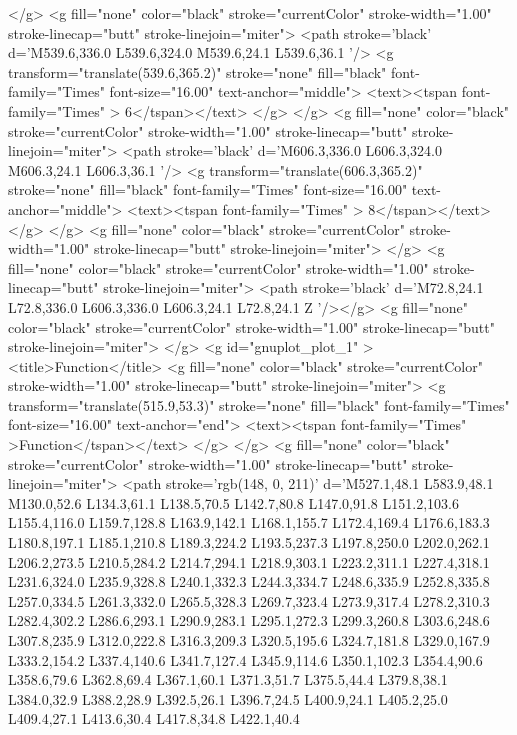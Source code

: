 </g>
<g fill="none" color="black" stroke="currentColor" stroke-width="1.00" stroke-linecap="butt" stroke-linejoin="miter">
	<path stroke='black'  d='M539.6,336.0 L539.6,324.0 M539.6,24.1 L539.6,36.1  '/>	<g transform="translate(539.6,365.2)" stroke="none" fill="black" font-family="Times" font-size="16.00"  text-anchor="middle">
		<text><tspan font-family="Times" > 6</tspan></text>
	</g>
</g>
<g fill="none" color="black" stroke="currentColor" stroke-width="1.00" stroke-linecap="butt" stroke-linejoin="miter">
	<path stroke='black'  d='M606.3,336.0 L606.3,324.0 M606.3,24.1 L606.3,36.1  '/>	<g transform="translate(606.3,365.2)" stroke="none" fill="black" font-family="Times" font-size="16.00"  text-anchor="middle">
		<text><tspan font-family="Times" > 8</tspan></text>
	</g>
</g>
<g fill="none" color="black" stroke="currentColor" stroke-width="1.00" stroke-linecap="butt" stroke-linejoin="miter">
</g>
<g fill="none" color="black" stroke="currentColor" stroke-width="1.00" stroke-linecap="butt" stroke-linejoin="miter">
	<path stroke='black'  d='M72.8,24.1 L72.8,336.0 L606.3,336.0 L606.3,24.1 L72.8,24.1 Z  '/></g>
<g fill="none" color="black" stroke="currentColor" stroke-width="1.00" stroke-linecap="butt" stroke-linejoin="miter">
</g>
	<g id="gnuplot_plot_1" ><title>Function</title>
<g fill="none" color="black" stroke="currentColor" stroke-width="1.00" stroke-linecap="butt" stroke-linejoin="miter">
	<g transform="translate(515.9,53.3)" stroke="none" fill="black" font-family="Times" font-size="16.00"  text-anchor="end">
		<text><tspan font-family="Times" >Function</tspan></text>
	</g>
</g>
<g fill="none" color="black" stroke="currentColor" stroke-width="1.00" stroke-linecap="butt" stroke-linejoin="miter">
	<path stroke='rgb(148,   0, 211)'  d='M527.1,48.1 L583.9,48.1 M130.0,52.6 L134.3,61.1 L138.5,70.5 L142.7,80.8 L147.0,91.8 L151.2,103.6
		L155.4,116.0 L159.7,128.8 L163.9,142.1 L168.1,155.7 L172.4,169.4 L176.6,183.3 L180.8,197.1 L185.1,210.8
		L189.3,224.2 L193.5,237.3 L197.8,250.0 L202.0,262.1 L206.2,273.5 L210.5,284.2 L214.7,294.1 L218.9,303.1
		L223.2,311.1 L227.4,318.1 L231.6,324.0 L235.9,328.8 L240.1,332.3 L244.3,334.7 L248.6,335.9 L252.8,335.8
		L257.0,334.5 L261.3,332.0 L265.5,328.3 L269.7,323.4 L273.9,317.4 L278.2,310.3 L282.4,302.2 L286.6,293.1
		L290.9,283.1 L295.1,272.3 L299.3,260.8 L303.6,248.6 L307.8,235.9 L312.0,222.8 L316.3,209.3 L320.5,195.6
		L324.7,181.8 L329.0,167.9 L333.2,154.2 L337.4,140.6 L341.7,127.4 L345.9,114.6 L350.1,102.3 L354.4,90.6
		L358.6,79.6 L362.8,69.4 L367.1,60.1 L371.3,51.7 L375.5,44.4 L379.8,38.1 L384.0,32.9 L388.2,28.9
		L392.5,26.1 L396.7,24.5 L400.9,24.1 L405.2,25.0 L409.4,27.1 L413.6,30.4 L417.8,34.8 L422.1,40.4
